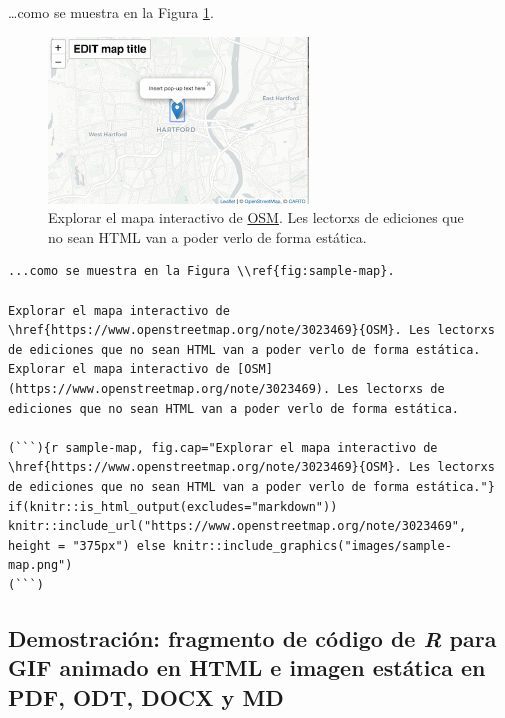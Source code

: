 \documentclass[
]{book}
\begin{document}
\ldots como se muestra en la Figura \ref{fig:sample-map}.



\begin{figure}
\centering
\includegraphics{images/sample-map.pdf}
\caption{\label{fig:sample-map}Explorar el mapa interactivo de \href{https://www.openstreetmap.org/note/3023469}{OSM}. Les lectorxs de ediciones que no sean HTML van a poder verlo de forma estática.}
\end{figure}

\begin{verbatim}
...como se muestra en la Figura \\ref{fig:sample-map}.

Explorar el mapa interactivo de \href{https://www.openstreetmap.org/note/3023469}{OSM}. Les lectorxs de ediciones que no sean HTML van a poder verlo de forma estática. Explorar el mapa interactivo de [OSM](https://www.openstreetmap.org/note/3023469). Les lectorxs de ediciones que no sean HTML van a poder verlo de forma estática.

(```){r sample-map, fig.cap="Explorar el mapa interactivo de \href{https://www.openstreetmap.org/note/3023469}{OSM}. Les lectorxs de ediciones que no sean HTML van a poder verlo de forma estática."}
if(knitr::is_html_output(excludes="markdown")) knitr::include_url("https://www.openstreetmap.org/note/3023469", height = "375px") else knitr::include_graphics("images/sample-map.png")
(```)
\end{verbatim}

\hypertarget{demostraciuxf3n-fragmento-de-cuxf3digo-de-r-para-gif-animado-en-html-e-imagen-estuxe1tica-en-pdf-odt-docx-y-md}{%
\subsection{\texorpdfstring{Demostración: fragmento de código de \emph{R} para GIF animado en HTML e imagen estática en PDF, ODT, DOCX y MD}{Demostración: fragmento de código de R para GIF animado en HTML e imagen estática en PDF, ODT, DOCX y MD}}\label{demostraciuxf3n-fragmento-de-cuxf3digo-de-r-para-gif-animado-en-html-e-imagen-estuxe1tica-en-pdf-odt-docx-y-md}}
\end{document}
